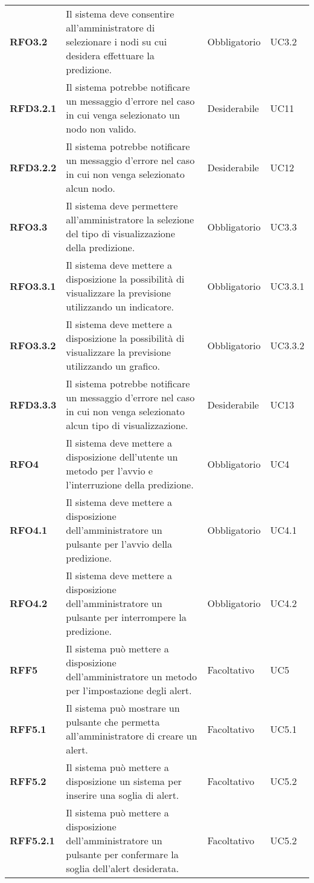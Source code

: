 \begin{longtable}[H]{>{\centering\bfseries}m{2cm} >{\centering}m{9cm} >{\centering}m{2.5cm} >{\centering\arraybackslash}m{2.5cm}}
  \textbf{RFO3.2} & Il sistema deve consentire all’amministratore di selezionare i nodi su cui desidera effettuare la predizione. & Obbligatorio & UC3.2 \\
  \textbf{RFD3.2.1} & Il sistema potrebbe notificare un messaggio d'errore nel caso in cui venga selezionato un nodo non valido. & Desiderabile & UC11 \\
  \textbf{RFD3.2.2} & Il sistema potrebbe notificare un messaggio d'errore nel caso in cui non venga selezionato alcun nodo. & Desiderabile & UC12 \\
  \textbf{RFO3.3} & Il sistema deve permettere all’amministratore la selezione del tipo di visualizzazione della predizione. & Obbligatorio & UC3.3 \\
  \textbf{RFO3.3.1} & Il sistema deve mettere a disposizione la possibilità di visualizzare la previsione utilizzando un indicatore. & Obbligatorio & UC3.3.1 \\
  \textbf{RFO3.3.2} & Il sistema deve mettere a disposizione la possibilità di visualizzare la previsione utilizzando un grafico. & Obbligatorio & UC3.3.2 \\
  \textbf{RFD3.3.3} & Il sistema potrebbe notificare un messaggio d'errore nel caso in cui non venga selezionato alcun tipo di visualizzazione. & Desiderabile & UC13 \\
  \textbf{RFO4} & Il sistema deve mettere a disposizione dell’utente un metodo per l’avvio e l’interruzione della predizione. & Obbligatorio & UC4 \\
  \textbf{RFO4.1} & Il sistema deve mettere a disposizione dell’amministratore un pulsante per l’avvio della predizione. & Obbligatorio & UC4.1 \\
  \textbf{RFO4.2} & Il sistema deve mettere a disposizione dell’amministratore un pulsante per interrompere la predizione. & Obbligatorio & UC4.2 \\
  \textbf{RFF5} & Il sistema può mettere a disposizione dell’amministratore un metodo per l’impostazione degli alert. & Facoltativo & UC5 \\
  \textbf{RFF5.1} & Il sistema può mostrare un pulsante che permetta all'amministratore di creare un alert. & Facoltativo & UC5.1 \\
  \textbf{RFF5.2} & Il sistema può mettere a disposizione un sistema per inserire una soglia di alert. & Facoltativo & UC5.2 \\
  \textbf{RFF5.2.1} & Il sistema può mettere a disposizione dell’amministratore un pulsante per confermare la soglia dell’alert desiderata. & Facoltativo & UC5.2 \\

\end{longtable}
